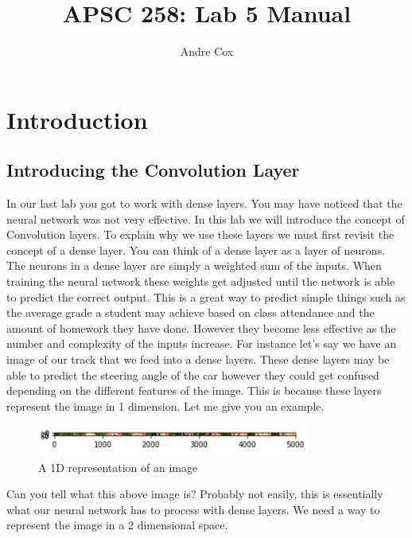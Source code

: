 \documentclass[11pt]{report}
\title{APSC 258: Lab 5 Manual}
\author{Andre Cox}
\begin{document}
\maketitle
\tableofcontents

\clearpage

\chapter{Introduction}
\section{Introducing the Convolution Layer}
In our last lab you got to work with dense layers. You may have noticed that the neural network was not very effective. In this lab we will introduce the concept of Convolution layers. To explain why we use these layers we must first revisit the concept of a dense layer. You can think of a dense layer as a layer of neurons. The neurons in a dense layer are simply a weighted sum of the inputs. When training the neural network these weights get adjusted until the network is able to predict the correct output. This is a great way to predict simple things such as the average grade a student may achieve based on class attendance and the amount of homework they have done. However they become less effective as the number and complexity of the inputs increase. For instance let's say we have an image of our track that we feed into a dense layers. These dense layers may be able to predict the steering angle of the car however they could get confused depending on the different features of the image. This is because these layers represent the image in 1 dimension. Let me give you an example. 

\begin{figure}[h]
\centering
\includegraphics[width=0.8\textwidth]{./images/dogdense.png}
\caption{A 1D representation of an image}
\label{fig:1d}
\end{figure}

Can you tell what this above image is? Probably not easily, this is essentially what our neural network has to process with dense layers. We need a way to represent the image in a 2 dimensional space.
\end{document}
